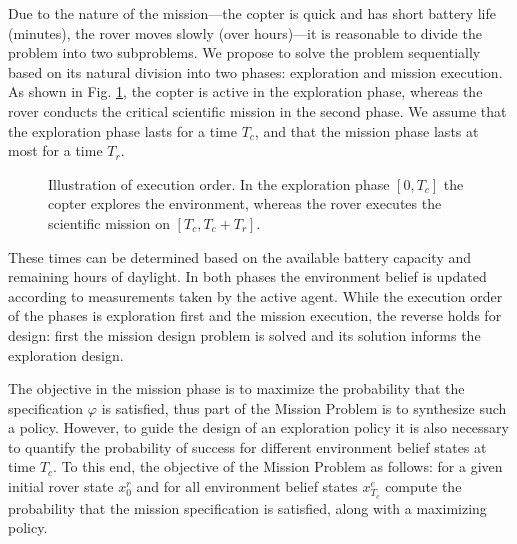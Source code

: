 \documentclass[conference]{IEEEtran}
\begin{document}
Due to the nature of the mission---the copter is quick and has short battery life (minutes), the rover moves slowly (over hours)---it is reasonable to divide the problem into two subproblems. We propose to solve the problem sequentially based on its natural division into two phases: exploration and mission execution. As shown in Fig. \ref{fig:execorder}, the copter is active in the exploration phase, whereas the rover conducts the critical scientific mission in the second phase. We assume that the exploration phase lasts for a time $T_c$, and that the mission phase lasts at most for a time $T_r$.
%
\begin{figure}
	\centering
	\caption{Illustration of execution order. In the exploration phase $[0, T_c]$ the copter explores the environment, whereas the rover executes the scientific mission on $[T_c, T_c + T_r]$.}	
	\label{fig:execorder}
\end{figure}
%
These times can be determined based on the available battery capacity and remaining hours of daylight. In both phases the environment belief is updated according to measurements taken by the active agent. While the execution order of the phases is exploration first and the mission execution, the reverse holds for design: first the mission design problem is solved and its solution informs the exploration design.

\smallskip
{} The objective in the mission phase is to maximize the probability that the specification $\varphi$ is satisfied, thus part of the Mission Problem is to synthesize such a policy. However, to guide the design of an exploration policy it is also necessary to quantify the probability of success for different environment belief states at time $T_c$. To this end, the objective of the Mission Problem as follows: for a given initial rover state $x^r_{0}$ and for all environment belief states $x^e_{T_c}$ compute the probability that the mission specification is satisfied, along with a maximizing policy.
\end{document}
